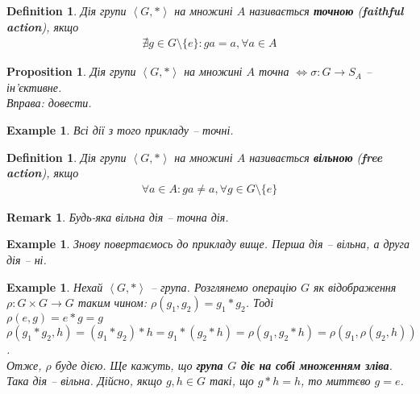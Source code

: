 \documentclass[a4paper, 10pt]{article}
\theoremstyle{theoremdd}
\theoremstyle{theoremdd}
\newtheorem{definition}[theorem]{Definition}
\theoremstyle{theoremdd}
\theoremstyle{theoremdd}
\theoremstyle{theoremdd}
\newtheorem{example}[theorem]{Example}
\theoremstyle{theoremdd}
\theoremstyle{theoremdd}
\theoremstyle{theoremdd}
\theoremstyle{theoremdd}
\newtheorem{proposition}[theorem]{Proposition}
\theoremstyle{theoremdd}
\theoremstyle{theoremdd}
\newtheorem{remark}[theorem]{Remark}
\theoremstyle{theoremdd}
\theoremstyle{theoremdd}
\theoremstyle{theoremdd}
\theoremstyle{theoremdd}
\begin{document}
\begin{definition}
Дія групи $\left< G,*\right>$ на множині $A$ називається \textbf{точною} (\textbf{faithful action}), якщо
\begin{align*}
\nexists g \in G \setminus \{e\} : ga = a, \forall a \in A
\iffalse \forall g \in G \setminus \{e\}: \exists a \in A: ga \neq a \fi
\end{align*}
\end{definition}

\begin{proposition}
Дія групи $\left< G,*\right>$ на множині $A$ точна $\iff \sigma \colon G \to S_A$ -- ін'єктивне.\\
\textit{Вправа: довести.}
\end{proposition}

\begin{example}
Всі дії з того прикладу -- точні.
\end{example}

\begin{definition}
Дія групи $\left< G,*\right>$ на множині $A$ називається \textbf{вільною} (\textbf{free action}), якщо
\begin{align*}
\forall a \in A: ga \neq a, \forall g \in G \setminus \{e\}
\end{align*}
\end{definition}

\begin{remark}
Будь-яка вільна дія -- точна дія.
\end{remark}

\begin{example}
Знову повертаємось до прикладу вище. Перша дія -- вільна, а друга дія -- ні.
\end{example}

\begin{example}
Нехай $\left< G,*\right>$ -- група. Розглянемо операцію $G$ як відображення $\rho \colon G \times G \to G$ таким чином: $\rho(g_1,g_2) = g_1*g_2$. Тоді\\
$\rho(e,g) = e*g = g$\\
$\rho(g_1*g_2,h) = (g_1*g_2)*h = g_1*(g_2*h) = \rho(g_1,g_2*h) = \rho(g_1,\rho(g_2,h))$.\\
Отже, $\rho$ буде дією. Ще кажуть, що \textbf{група $G$ діє на собі множенням зліва}.\\
Така дія -- вільна. Дійсно, якщо $g,h \in G$ такі, що $g*h = h$, то миттєво $g = e$.
\end{example}
\end{document}
